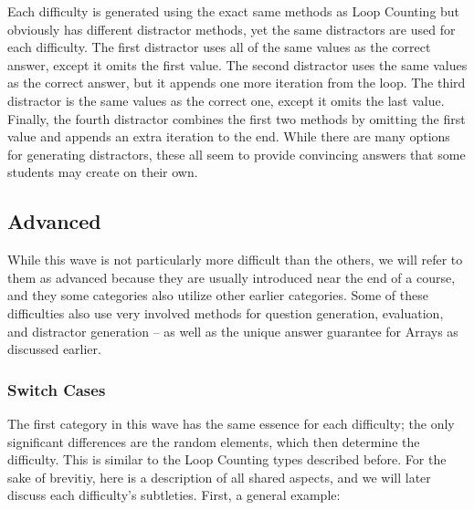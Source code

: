 \documentclass{article}
\begin{document}
Each difficulty is generated using the exact same methods as Loop Counting but obviously has different distractor methods, yet the same distractors are used for each difficulty. The first 
distractor uses all of the same values as the correct answer, except it omits the first value. The second distractor uses the same values as the correct answer, but it appends one more iteration
from the loop. The third distractor is the same values as the correct one, except it omits the last value. Finally, the fourth distractor combines the first two methods by omitting the first value
and appends an extra iteration to the end. While there are many options for generating distractors, these all seem to provide convincing answers that some students may create on their own.

\subsection{Advanced}

While this wave is not particularly more difficult than the others, we will refer to them as advanced because they are usually introduced near the end of a course, and they some categories also 
utilize other earlier categories. Some of these difficulties also use very involved methods for question generation, evaluation, and distractor generation -- as well as the unique answer guarantee 
for Arrays as discussed earlier. 

\subsubsection{Switch Cases}
The first category in this wave has the same essence for each difficulty; the only significant differences are the random elements, which then determine the difficulty. This is similar to the Loop 
Counting types described before. For the sake of brevitiy, here is a description of all shared aspects, and we will later discuss each difficulty's subtleties. First, a general example:
\end{document}
